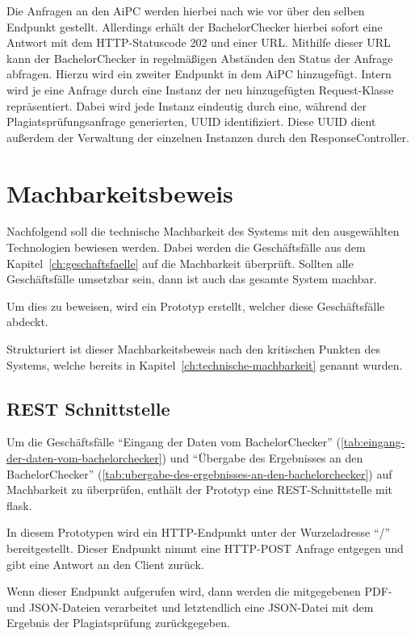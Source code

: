 Die Anfragen an den \ac{AiPC} werden hierbei nach wie vor über den selben Endpunkt gestellt.
Allerdings erhält der BachelorChecker hierbei sofort eine Antwort mit dem \ac{HTTP}-Statuscode 202 und einer \ac{URL}.
Mithilfe dieser \ac{URL} kann der BachelorChecker in regelmäßigen Abständen den Status der Anfrage abfragen.
Hierzu wird ein zweiter Endpunkt in dem \ac{AiPC} hinzugefügt.
Intern wird je eine Anfrage durch eine Instanz der neu hinzugefügten Request-Klasse repräsentiert.
Dabei wird jede Instanz eindeutig durch eine, während der Plagiatsprüfungsanfrage generierten, \ac{UUID} identifiziert.
Diese \ac{UUID} dient außerdem der Verwaltung der einzelnen Instanzen durch den ResponseController.


\section{Machbarkeitsbeweis}\label{sec:machbarkeitsbeweis}

Nachfolgend soll die technische Machbarkeit des Systems mit den ausgewählten Technologien bewiesen werden.
Dabei werden die Geschäftsfälle aus dem Kapitel~\ref{ch:geschaftsfaelle} auf die Machbarkeit überprüft.
Sollten alle Geschäftsfälle umsetzbar sein, dann ist auch das gesamte System machbar.

Um dies zu beweisen, wird ein Prototyp erstellt, welcher diese Geschäftsfälle abdeckt.

Strukturiert ist dieser Machbarkeitsbeweis nach den kritischen Punkten des Systems,
welche bereits in Kapitel~\ref{ch:technische-machbarkeit} genannt wurden.

\subsection{REST Schnittstelle}\label{subsec:rest-schnittstelle}
Um die Geschäftsfälle ``Eingang der Daten vom BachelorChecker'' (\ref{tab:eingang-der-daten-vom-bachelorchecker})
und ``Übergabe des Ergebnisses an den BachelorChecker'' (\ref{tab:ubergabe-des-ergebnisses-an-den-bachelorchecker})
auf Machbarkeit zu überprüfen, enthält der Prototyp eine REST-Schnittstelle mit flask.

In diesem Prototypen wird ein HTTP-Endpunkt unter der Wurzeladresse ``/'' bereitgestellt.
Dieser Endpunkt nimmt eine HTTP-POST Anfrage entgegen und gibt eine Antwort an den Client zurück.

Wenn dieser Endpunkt aufgerufen wird, dann werden die mitgegebenen PDF- und JSON-Dateien verarbeitet
und letztendlich eine JSON-Datei mit dem Ergebnis der Plagiatsprüfung zurückgegeben.

